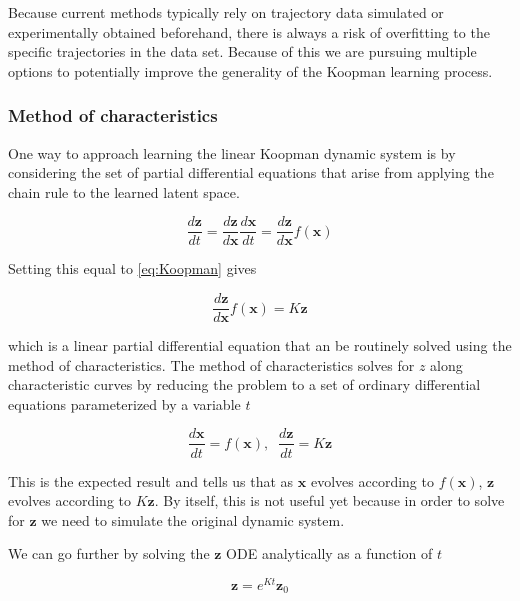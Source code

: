\documentclass[12pt, letterpaper]{article}
\begin{document}
Because current methods typically rely on trajectory data simulated or experimentally obtained beforehand, there is always a risk of overfitting to the specific trajectories in the data set.  Because of this we are pursuing multiple options to potentially improve the generality of the Koopman learning process.

\subsubsection{Method of characteristics}

One way to approach learning the linear Koopman dynamic system is by considering the set of partial differential equations that arise from applying the chain rule to the learned latent space.

\begin{equation}
    \frac{d \mathbf{z}}{dt} = \frac{d \mathbf{z}}{d \mathbf{x}} \frac{d \mathbf{x}}{dt} = \frac{d \mathbf{z}}{d \mathbf{x}} f(\mathbf{x})
\end{equation}

Setting this equal to \ref{eq:Koopman} gives

\begin{equation}
    \frac{d \mathbf{z}}{d \mathbf{x}} f(\mathbf{x}) = K \mathbf{z}
\end{equation}

which is a linear partial differential equation that an be routinely solved using the method of characteristics.  The method of characteristics solves for $z$ along characteristic curves by reducing the problem to a set of ordinary differential equations parameterized by a variable $t$

\begin{equation}
    \frac{d\mathbf{x}}{dt} = f(\mathbf{x}), \; \;
    \frac{d\mathbf{z}}{dt} = K \mathbf{z}
\end{equation}

This is the expected result and tells us that as $\mathbf{x}$ evolves according to $f(\mathbf{x})$, $\mathbf{z}$ evolves according to $K \mathbf{z}$.  By itself, this is not useful yet because in order to solve for $\mathbf{z}$ we need to simulate the original dynamic system.

We can go further by solving the $\mathbf{z}$ ODE analytically as a function of $t$

\begin{equation}
    \mathbf{z} = e^{Kt}\mathbf{z}_0
\end{equation}
\end{document}
